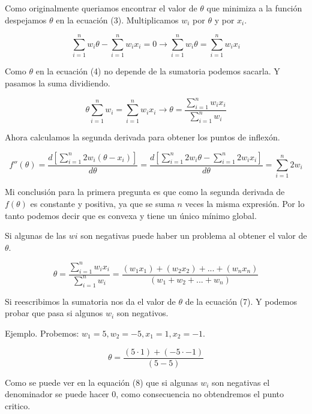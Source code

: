\documentclass[12pt]{exam}
\begin{document}
\begin{enumerate}
\begin{enumerate}[label=a.]
\justify
Como originalmente queriamos encontrar el valor de $\theta$ que minimiza a la funci\'on despejamos $\theta$ en la ecuaci\'on (3). Multiplicamos $w_i$ por $\theta$ y por $x_i$.

\begin{equation}
    \sum_{i=1}^n w_i \theta - \sum_{i=1}^n w_i x_i = 0 \rightarrow \sum_{i=1}^n w_i \theta = \sum_{i=1}^n w_i x_i
\end{equation}

\justify
Como $\theta$ en la ecuaci\'on (4) no depende de la sumatoria podemos sacarla. Y pasamos la suma dividiendo.

\begin{equation}
    \theta \sum_{i=1}^n w_i = \sum_{i=1}^n w_i x_i \rightarrow \theta = \frac{\sum_{i=1}^n w_i x_i}{\sum_{i=1}^n w_i}
\end{equation}

\justify
Ahora calculamos la segunda derivada para obtener los puntos de inflex\'on.

\begin{equation}
    f''(\theta) = \frac{d[\sum_{i=1}^n 2 w_i (\theta - x_i)]}{d\theta} = \frac{d[\sum_{i=1}^n 2 w_i \theta - \sum_{i=1}^n 2 w_i x_i]}{d\theta} = \sum_{i=1}^n 2w_i
\end{equation}

\justify
Mi conclusi\'on para la primera pregunta es que como la segunda derivada de $f(\theta)$ es constante y positiva, ya que se suma $n$ veces la misma expresi\'on. Por lo tanto podemos decir que es convexa y tiene un único mínimo global.

\justify
Si algunas de las $wi$ son negativas puede haber un problema al obtener el valor de $\theta$.

\begin{equation}
    \theta = \frac{\sum_{i=1}^n w_i x_i}{\sum_{i=1}^n w_i} = \frac{(w_1 x_1)+(w_2 x_2)+...+(w_n x_n)}{(w_1+w_2+...+w_n)}
\end{equation}

\justify
Si reescribimos la sumatoria nos da el valor de $\theta$ de la ecuaci\'on (7). Y podemos probar que pasa si algunos $w_i$ son negativos.

\justify
Ejemplo. Probemos: $w_1 = 5, w_2 = -5, x_1 = 1, x_2 = -1$.

\begin{equation}
    \theta = \frac{(5\cdot1)+(-5\cdot-1)}{(5-5)}
\end{equation}

\justify
Como se puede ver en la equaci\'on (8) que si algunas $w_i$ son negativas el denominador se puede hacer $0$, como consecuencia no obtendremos el punto critico.


\end{enumerate}
\end{enumerate}
\end{document}
